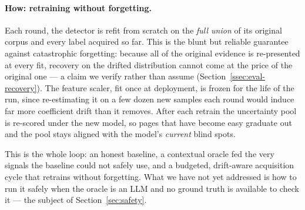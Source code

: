 \paragraph{How: retraining without forgetting.}
Each round, the detector is refit from scratch on the \emph{full union} of its
original corpus and every label acquired so far. This is the blunt but reliable
guarantee against catastrophic forgetting: because all of the original evidence
is re-presented at every fit, recovery on the drifted distribution cannot come
at the price of the original one --- a claim we verify rather than assume
(Section~\ref{ssec:eval-recovery}). The feature scaler, fit once at deployment,
is frozen for the life of the run, since re-estimating it on a few dozen new
samples each round would induce far more coefficient drift than it removes.
After each retrain the uncertainty pool is re-scored under the new model, so
pages that have become easy graduate out and the pool stays aligned with the
model's \emph{current} blind spots.

\medskip\noindent
This is the whole loop: an honest baseline, a contextual oracle fed the very
signals the baseline could not safely use, and a budgeted, drift-aware
acquisition cycle that retrains without forgetting. What we have not yet
addressed is how to run it safely when the oracle is an LLM and no ground truth
is available to check it --- the subject of Section~\ref{sec:safety}.
